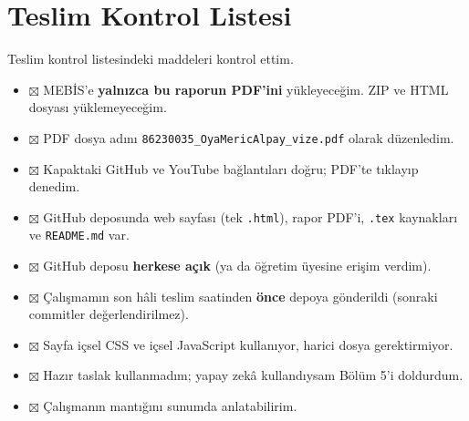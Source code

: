 \documentclass[12pt,a4paper]{article}
\begin{document}
\section{Teslim Kontrol Listesi}
Teslim kontrol listesindeki maddeleri kontrol ettim.
\begin{itemize}[label={}]
  \item $\boxtimes$ MEBİS'e \textbf{yalnızca bu raporun PDF'ini} yükleyeceğim. ZIP ve HTML dosyası yüklemeyeceğim.
  \item $\boxtimes$ PDF dosya adını \texttt{86230035\_OyaMericAlpay\_vize.pdf} olarak düzenledim.
  \item $\boxtimes$ Kapaktaki GitHub ve YouTube bağlantıları doğru; PDF'te tıklayıp denedim.
  \item $\boxtimes$ GitHub deposunda web sayfası (tek \texttt{.html}), rapor PDF'i, \texttt{.tex} kaynakları ve \texttt{README.md} var.
  \item $\boxtimes$ GitHub deposu \textbf{herkese açık} (ya da öğretim üyesine erişim verdim).
  \item $\boxtimes$ Çalışmamın son hâli teslim saatinden \textbf{önce} depoya gönderildi (sonraki commitler değerlendirilmez).
  \item $\boxtimes$ Sayfa içsel CSS ve içsel JavaScript kullanıyor, harici dosya gerektirmiyor.
  \item $\boxtimes$ Hazır taslak kullanmadım; yapay zekâ kullandıysam Bölüm 5'i doldurdum.
  \item $\boxtimes$ Çalışmanın mantığını sunumda anlatabilirim.
\end{itemize}
\end{document}
